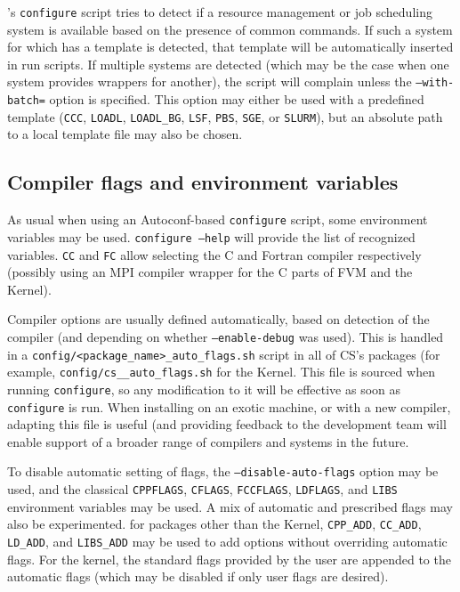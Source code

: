 \documentclass[a4paper,10pt,twoside]{article}
\begin{document}
\CS's {\tt configure} script tries to detect if a resource management or
job scheduling system is available based on the presence of common commands.
If such a system for which \CS has a template is detected,
that template will be automatically inserted in run scripts.
If multiple systems are detected (which may be the case when one system provides
wrappers for another), the script will complain unless the \texttt{--with-batch=}
option is specified. This option may either be used with a predefined template
(\texttt{CCC}, \texttt{LOADL}, \texttt{LOADL\_BG}, \texttt{LSF}, \texttt{PBS},
\texttt{SGE}, or \texttt{SLURM}), but an absolute path to a local template
file may also be chosen.

\subsection{Compiler flags and environment variables\label{sec:config:flags}}

As usual when using an Autoconf-based \texttt{configure} script,
some environment variables may be used. \texttt{configure --help}
will provide the list of recognized variables.
\texttt{CC} and \texttt{FC} allow selecting the C and Fortran compiler
respectively (possibly using an MPI compiler wrapper for the C parts
of FVM and the Kernel).

Compiler options are usually defined automatically, based on
detection of the compiler (and depending on whether \texttt{--enable-debug}
was used). This is handled in a \texttt{config/<package\_name>\_auto\_flags.sh}
script in all of CS's packages (for example,
\texttt{config/cs\_\_auto\_flags.sh}
for the Kernel. This file is sourced when running \texttt{configure}, so
any modification to it will be effective as soon as \texttt{configure} is run.
When installing on an exotic machine, or with a new compiler, adapting this
file is useful (and providing feedback to the \CS development team
will enable support of a broader range of compilers and systems in the
future.

To disable automatic setting of flags, the \texttt{--disable-auto-flags}
option may be used, and the classical \texttt{CPPFLAGS}, \texttt{CFLAGS},
\texttt{FCCFLAGS}, \texttt{LDFLAGS}, and \texttt{LIBS} environment variables
may be used. A mix of automatic and prescribed flags may also be experimented.
for packages other than the Kernel, \texttt{CPP\_ADD}, \texttt{CC\_ADD},
\texttt{LD\_ADD}, and \texttt{LIBS\_ADD} may be used to add options without
overriding automatic flags. For the kernel, the standard flags provided by
the user are appended to the automatic flags (which may be disabled
if only user flags are desired).
\end{document}
